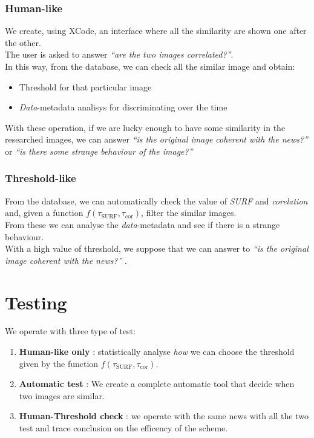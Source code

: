 \documentclass[10pt, journal,twocolumn]{IEEEtran}
\begin{document}
\subsubsection{Human-like}

We create, using XCode, an interface where all the similarity are shown one after the other.\\
The user is asked to answer \emph{``are the two images correlated?''}.\\[0,1cm]
In this way, from the database, we can check all the similar image and obtain:
\begin{itemize}
  \item Threshold for that particular image
  \item \emph{Data}-metadata analisys for discriminating over the time
\end{itemize}

With these operation, if we are lucky enough to have some similarity in the researched images, we can answer \emph{``is the original image coherent with the news?''} or \emph{``is there some strange behaviour of the image?''}

\subsubsection{Threshold-like}

From the database, we can automatically check the value of \emph{SURF} and \emph{corelation} and, given a function $f(\tau_{\text{SURF}} , \tau_{\text{cor}})$, filter the similar images.\\
From these we can analyse the \emph{data}-metadata and see if there is a strange behaviour.\\
With a high value of threshold, we suppose that we can answer to \emph{``is the original image coherent with the news?''} .


\section{Testing}

We operate with three type of test:

\begin{enumerate}
  \item \textbf{Human-like only} : statistically analyse \emph{how} we can choose the threshold given by the function $f(\tau_{\text{SURF}} , \tau_{\text{cor}})$.
  \item \textbf{Automatic test} : We create a complete automatic tool that decide when two images are similar.
  \item \textbf{Human-Threshold check} : we operate with the same news with all the two test and trace conclusion on the efficency of the scheme.
\end{enumerate}
\end{document}
